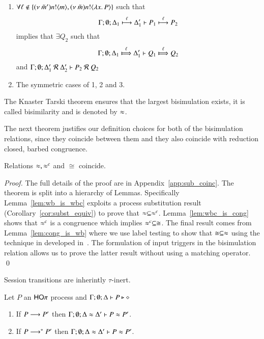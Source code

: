 \begin{definition}[Bisimulation]
\begin{enumerate}
		\item	$\forall \ell \notin \set{\news{\tilde{m}'} \bactout{n}{m}, \news{\tilde{m}} \bactout{n}{\abs{x}{P}}}$ such that
			\[
				\horel{\Gamma}{\Delta_1}{P_1}{\hby{\ell}}{\Delta_1'}{P_2}
			\]
			implies that $\exists Q_2$ such that 
			\[
				\horel{\Gamma}{\Delta_1}{Q_1}{\Hby{\ell}}{\Delta_1'}{Q_2}
			\]
			and
			$\horel{\Gamma}{\Delta_1'}{P_2}{\ \mathcal{R}\ }{\Delta_2'}{Q_2}$

		\item	The symmetric cases of 1, 2 and 3.
	\end{enumerate}
	The Knaster Tarski theorem ensures that the largest bisimulation exists, it is called bisimilarity and is denoted by $\wb$.
\end{definition}

The next theorem justifies our definition choices
for both of the bisimulation relations, since
they coincide between them and they also
coincide with reduction closed, barbed congruence.

\begin{theorem}[Coincidence]\rm
	\label{the:coincidence}
	Relations $\wb, \wbc$ and $\cong$ coincide.
\end{theorem}

\begin{proof}
	The full details of the proof are in Appendix~\ref{app:sub_coinc}.
	The theorem is split into a hierarchy of Lemmas. Specifically
	Lemma~\ref{lem:wb_is_wbc} exploits a process substitution result
	(Corollary~\ref{cor:subst_equiv}) to prove that $\wb \subseteq \wbc$.
	Lemma~\ref{lem:wbc_is_cong} shows that $\wbc$ is a congruence
	which implies $\wbc \subseteq \cong$.
	The final result comes from Lemma~\ref{lem:cong_is_wb} where
	we use label testing to show that $\cong \subseteq \wb$ using
	the technique in developed in~\cite{Hennessy07}. The formulation of input
	triggers in the bisimulation relation allows us to prove
	the latter result without using a matching operator.
	\qed
\end{proof}

Session transitions are inherintly $\tau$-inert.

\begin{lemma}\rm
	\label{lem:tau_inert}
	Let $P$ an $\HOp$ process
	and $\Gamma; \emptyset; \Delta \proves P \hastype \Proc$
	\begin{enumerate}
		\item	If $P \red P'$ then $\Gamma; \es; \Delta \wb \Delta' \proves P \wb P'$.
		\item	If $P \red^* P'$ then $\Gamma; \es; \Delta \wb \Delta' \proves P \wb P'$.
	\end{enumerate}
\end{lemma}

